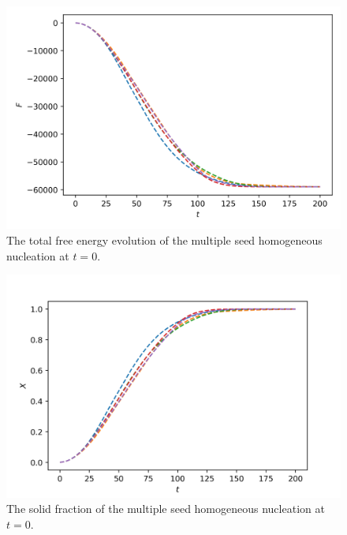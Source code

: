 \documentclass[preprint,12pt]{elsarticle}
\begin{document}
%
\begin{center}
\begin{figure} 
\begin{centering}
\includegraphics[scale=0.65]{free_energy_multiple_seed_t0.PNG}
\par\end{centering}
\caption{The total free energy evolution of the multiple seed homogeneous nucleation at $t=0$.} \label{fig:free_energy_multiple_seed_t0}
\end{figure}
\par\end{center}
%
\begin{center}
\begin{figure} 
\begin{centering}
\includegraphics[scale=0.65]{solid_fraction_multiple_seed_t0.PNG}
\par\end{centering}
\caption{The solid fraction of the multiple seed homogeneous nucleation at $t=0$.}  \label{fig:solid_fraction_multiple_seed_t0}
\end{figure}
\par\end{center}
\end{document}
